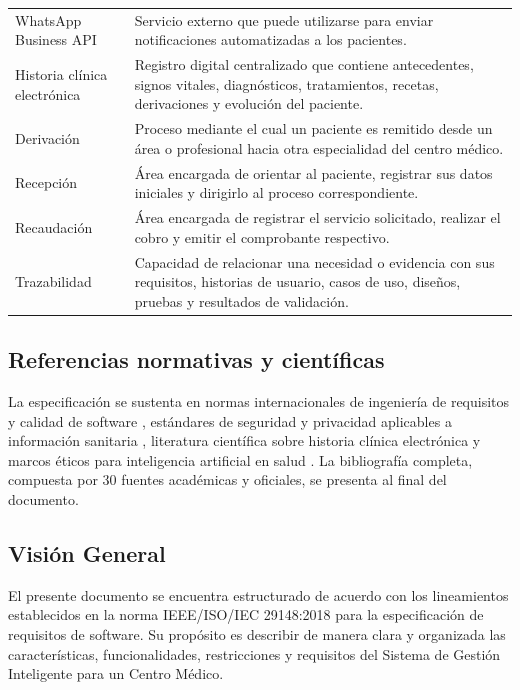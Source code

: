 \documentclass[11pt,a4paper]{article}
\begin{document}
\begin{longtable}{p{} p{}}
		WhatsApp Business API &
		Servicio externo que puede utilizarse para enviar notificaciones automatizadas a los pacientes. \\
		
		Historia clínica electrónica &
		Registro digital centralizado que contiene antecedentes, signos vitales, diagnósticos, tratamientos, recetas, derivaciones y evolución del paciente. \\
		
		Derivación &
		Proceso mediante el cual un paciente es remitido desde un área o profesional hacia otra especialidad del centro médico. \\
		
		Recepción &
		Área encargada de orientar al paciente, registrar sus datos iniciales y dirigirlo al proceso correspondiente. \\
		
		Recaudación &
		Área encargada de registrar el servicio solicitado, realizar el cobro y emitir el comprobante respectivo. \\
		
		Trazabilidad &
		Capacidad de relacionar una necesidad o evidencia con sus requisitos, historias de usuario, casos de uso, diseños, pruebas y resultados de validación. \\
		
	\end{longtable}
	
	
	\subsection{ Referencias normativas y científicas}
	
	La especificación se sustenta en normas internacionales de ingeniería de
	requisitos y calidad de software \cite{iso29148,iso25010}, estándares de
	seguridad y privacidad aplicables a información sanitaria
	\cite{iso27001,iso27799,nist80053,loppd}, literatura científica sobre historia
	clínica electrónica \cite{hayrinen2008,menachemi2011,campanella2016} y marcos
	éticos para inteligencia artificial en salud \cite{whoai2021,topol2019}.
	La bibliografía completa, compuesta por 30 fuentes académicas y oficiales,
	se presenta al final del documento.
	
	\subsection{ Visión General}
	
	El presente documento se encuentra estructurado de acuerdo con los lineamientos establecidos en la norma IEEE/ISO/IEC 29148:2018 para la especificación de requisitos de software. Su propósito es describir de manera clara y organizada las características, funcionalidades, restricciones y requisitos del Sistema de Gestión Inteligente para un Centro Médico.
	
\end{document}
